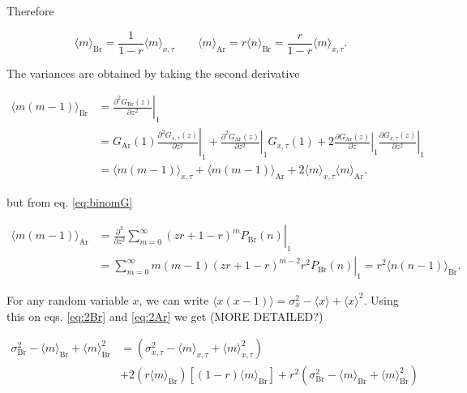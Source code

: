 Therefore

\begin{equation}
  \label{eq:aveBrAr}
  \langle m\rangle_\text{Br} = \frac{1}{1-r}\langle m\rangle_{x,\tau}\quad\quad \langle m\rangle_\text{Ar} = r\langle n\rangle_\text{Br} = \frac{r}{1-r}\langle m\rangle_{x,\tau}.
\end{equation}

The variances are obtained by taking the second derivative

\begin{equation}
  \label{eq:2Br}
  \begin{split}
    \langle m(m-1)\rangle_\text{Br} &= \left.\frac{\partial^2 G_\text{Br}(z)}{\partial z^2}\right|_1\\
    &=G_\text{Ar}(1)\left.\frac{\partial^2 G_{x,\tau}(z)}{\partial z^2}\right|_1 + \left.\frac{\partial^2 G_\text{Ar}(z)}{\partial z^2}\right|_1G_{x,\tau}(1) + 2\left.\frac{\partial G_\text{Ar}(z)}{\partial z}\right|_1\left.\frac{\partial G_{x,\tau}(z)}{\partial z^2}\right|_1\\
    &=\langle m(m-1)\rangle_{x,\tau}+\langle m(m-1)\rangle_\text{Ar}+2\langle m\rangle_{x,\tau}\langle m\rangle_\text{Ar}.
  \end{split}
\end{equation}

but from eq. \ref{eq:binomG}

\begin{equation}
  \label{eq:2Ar}
  \begin{split}
    \langle m(m-1)\rangle_\text{Ar} &= \left.\frac{\partial^2}{\partial z^2}\sum_{m=0}^\infty(zr+1-r)^mP_\text{Br}(n)\right|_1\\
    &= \left.\sum_{m=0}^\infty m(m-1)(zr+1-r)^{m-2}r^2P_\text{Br}(n)\right|_1 = r^2\langle n(n-1)\rangle_\text{Br}.
  \end{split}
\end{equation}

For any random variable $x$, we can write $\langle x(x-1)\rangle = \sigma_x^2 - \langle x\rangle + \langle x\rangle^2$. Using this on eqs. \ref{eq:2Br} and \ref{eq:2Ar} we get (MORE DETAILED?)

\begin{equation*}
  \begin{split}
  \sigma^2_\text{Br}- \langle m\rangle_\text{Br} + \langle m\rangle^2_\text{Br} &= \left( \sigma^2_{x,\tau} - \langle m\rangle_{x,\tau} + \langle m\rangle_{x,\tau}^2\right)\\
&+ 2\left(r\langle m\rangle_\text{Br}\right)\left[(1-r)\langle m\rangle_\text{Br}\right]+r^2\left(\sigma^2_\text{Br}- \langle m\rangle_\text{Br} + \langle m\rangle^2_\text{Br}\right)
  \end{split}
\end{equation*}


